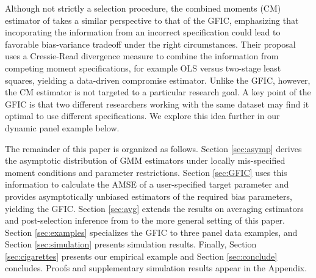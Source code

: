 Although not strictly a selection procedure, the combined moments (CM) estimator of \cite{JudgeMittelhammer} takes a similar perspective to that of the GFIC, emphasizing that incoporating the information from an incorrect specification could lead to favorable bias-variance tradeoff under the right circumstances. 
Their proposal uses a Cressie-Read divergence measure to combine the information from competing moment specifications, for example OLS versus two-stage least squares, yielding a data-driven compromise estimator. 
Unlike the GFIC, however, the CM estimator is not targeted to a particular research goal.
A key point of the GFIC is that two different researchers working with the same dataset may find it optimal to use different specifications.
We explore this idea further in our dynamic panel example below.

The remainder of this paper is organized as follows. Section \ref{sec:asymp} derives the asymptotic distribution of GMM estimators under locally mis-specified moment conditions and parameter restrictions. 
Section \ref{sec:GFIC} uses this information to calculate the AMSE of a user-specified target parameter and provides asymptotically unbiased estimators of the required bias parameters, yielding the GFIC. 
Section \ref{sec:avg} extends the results on averaging estimators and post-selection inference from \cite{DiTraglia2016} to the more general setting of this paper.
Section \ref{sec:examples} specializes the GFIC to three panel data examples, and Section \ref{sec:simulation} presents simulation results.
Finally, Section \ref{sec:cigarettes} presents our empirical example and  Section \ref{sec:conclude} concludes.  
Proofs and supplementary simulation results appear in the Appendix.

